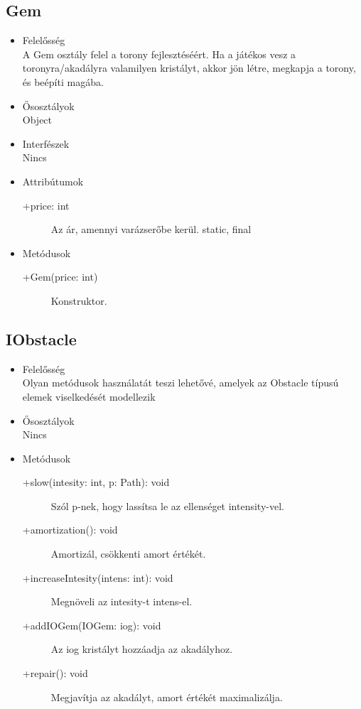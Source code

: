\subsection{Gem}
\begin{itemize}
\item Felelősség\\
A Gem osztály felel a torony fejlesztéséért. Ha a játékos vesz a toronyra/akadályra valamilyen kristályt, akkor jön létre, megkapja a torony, és beépíti magába. 
\item Ősosztályok\\
Object
\item Interfészek\\
Nincs
\item Attribútumok\\
	\begin{description}
		\item[+price: int] Az ár, amennyi varázserőbe kerül. static, final
	\end{description}
\item Metódusok\\
	\begin{description}
		
		\item[+Gem(price: int)] Konstruktor. 
		
		
	\end{description}
\end{itemize}

\subsection{IObstacle}
\begin{itemize}
\item Felelősség\\
Olyan metódusok használatát teszi lehetővé, amelyek az Obstacle típusú elemek viselkedését modellezik
\item Ősosztályok\\
Nincs

\item Metódusok\\
	\begin{description}
		\item[+slow(intesity: int, p: Path): void] Szól p-nek, hogy lassítsa le az ellenséget intensity-vel. 
\item[+amortization(): void] Amortizál, csökkenti amort értékét. 
\item[+increaseIntesity(intens: int): void] Megnöveli az intesity-t intens-el. 
\item[+addIOGem(IOGem: iog): void] Az iog kristályt hozzáadja az akadályhoz. 
\item[+repair(): void] Megjavítja az akadályt, amort értékét maximalizálja. 



		
		
	\end{description}
\end{itemize}
